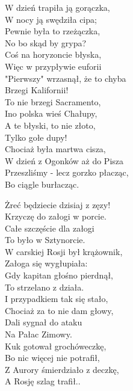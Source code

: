 \begin{multicols}{2}
W dzień trapiła ją gorączka, \\
W nocy ją swędziła cipa;\\
Pewnie była to rzeżączka, \\
No bo skąd by grypa? \\

Coś na horyzoncie błyska, \\
Więc w przypływie euforii\\
"Pierwszy" wrzasnął, że to chyba\\
Brzegi Kalifornii!\\

To nie brzegi Sacramento, \\
Ino polska wieś Chałupy, \\
A te błyski, to nie złoto, \\
Tylko gołe dupy! \\

Chociaż była martwa cisza, \\
W dzień z Ogonków aż do Pisza\\
Przeszliśmy - lecz gorzko płacząc, \\
Bo ciągle burłacząc.\\
\newcolumn

Żreć będziecie dzisiaj z zęzy!\\
Krzyczę do załogi w porcie.\\
Całe szczęście dla załogi\\
To było w Sztynorcie.\\

W carskiej Rosji był krążownik, \\
Załoga się wygłupiała:\\
Gdy kapitan głośno pierdnął, \\
To strzelano z działa.\\

I przypadkiem tak się stało, \\
Chociaż za to nie dam głowy, \\
Dali sygnał do ataku\\
Na Pałac Zimowy.\\

Kuk gotował grochóweczkę, \\
Bo nic więcej nie potrafił, \\
Z Aurory śmierdziało z deczkę, \\
A Rosję szlag trafił..\\

\end{multicols}
